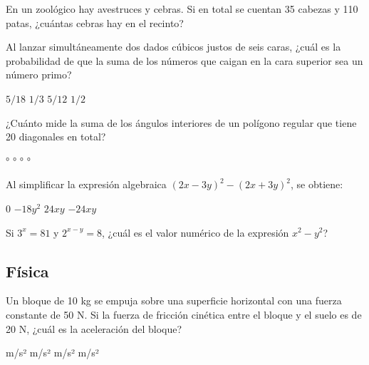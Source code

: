 \documentclass[12pt]{evaluasep}
\begin{document}
\begin{questions}
\question En un zoológico hay avestruces y cebras. Si en total se cuentan 35 cabezas y 110 patas, ¿cuántas cebras hay en el recinto?
    \begin{choices}
    \end{choices}

    \question Al lanzar simultáneamente dos dados cúbicos justos de seis caras, ¿cuál es la probabilidad de que la suma de los números que caigan en la cara superior sea un número primo?
    \begin{choices}
        \choice $5/18$
        \choice $1/3$
        \CorrectChoice $5/12$
        \choice $1/2$
    \end{choices}

    \question ¿Cuánto mide la suma de los ángulos interiores de un polígono regular que tiene 20 diagonales en total?
    \begin{choices}
        °
        ° 
        °
        °
    \end{choices}

    \question Al simplificar la expresión algebraica $(2x - 3y)^2 - (2x + 3y)^2$, se obtiene:
    \begin{choices}
        \choice $0$
        \choice $-18y^2$
        \choice $24xy$
        \CorrectChoice $-24xy$
    \end{choices}

    \question Si $3^x = 81$ y $2^{x-y} = 8$, ¿cuál es el valor numérico de la expresión $x^2 - y^2$?
    \begin{choices}
    \end{choices}

\subsection{Física}

\question Un bloque de 10 kg se empuja sobre una superficie horizontal con una fuerza constante de 50 N. Si la fuerza de fricción cinética entre el bloque y el suelo es de 20 N, ¿cuál es la aceleración del bloque?
    \begin{choices}
         m/s²
         m/s²
         m/s²
         m/s²
    \end{choices}

        \newpage


\end{questions}
\end{document}

